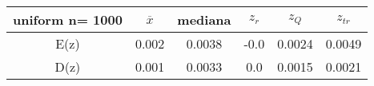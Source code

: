 \begin{tabular}{|c|c|c|c|c|c|}
\hline
uniform n= 1000& $\overline{x}$ & mediana & $z_r$ & $z_Q$ & $z_{tr}$ \\ \hline
E(z) & 0.002 & 0.0038 & -0.0 & 0.0024 & 0.0049 \\ \hline
D(z) & 0.001 & 0.0033 & 0.0 & 0.0015 & 0.0021 \\ \hline
\end{tabular}